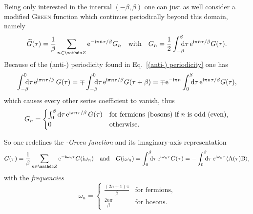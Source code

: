 Being only interested in the interval $(-\beta, \beta)$ one can just as well
consider a modified \textsc{Green} function which continues periodically beyond
this domain, namely
%
\begin{equation*}
    \widetilde G(\tau) = \frac 1 \beta \sum_{n \in \mathds Z}
        \E^{-\I \pi n \tau / \beta} G_n
    \quad \text{with} \quad
    G_n = \frac 1 2 \int \from{-\beta} \till \beta \D \tau \,
        \E^{\I \pi n \tau / \beta} G(\tau).
\end{equation*}
%
Because of the (anti-) periodicity found in Eq.~\ref{(anti-) periodicity} one
has
%
\begin{equation*}
    \int \from{-\beta} \till 0 \D \tau \, \E^{\I \pi n \tau / \beta} \, G(\tau)
    = \mp \int \from{-\beta} \till 0 \D \tau \,
        \E^{\I \pi n \tau / \beta} G(\tau + \beta)
    = \mp \E^{-\I \pi n} \int \from 0 \till \beta \D \tau \,
        \E^{\I \pi n \tau / \beta} G(\tau),
\end{equation*}
%
which causes every other series coefficient to vanish, thus
%
\begin{equation*}
    G_n =
    \begin{cases}
        \int_0^\beta \mathrm d \tau \, \mathrm e^{\mathrm i \pi n \tau / \beta} \, G(\tau)
        & \text{for fermions (bosons) if $n$ is odd (even),} \\ 0
        & \text{otherwise.}
    \end{cases}
\end{equation*}

So one redefines the \emph{-Green function} and its
imaginary-axis representation
%
\begin{equation} \label{Matsubara-Green function}
    G(\tau) = \frac 1 \beta \sum_{n \in \mathds Z}
        \E^{-\I \omega_n \tau} G(\I \omega_n)
    \quad \text{and} \quad
    G(\I \omega_n) = \int \from 0 \till \beta \D \tau \,
        \E^{\I \omega_n \tau} G(\tau)
    = -\int \from 0 \till \beta \D \tau \,
        \E^{\I \omega_n \tau} \av{\op A(\tau) \op B},
\end{equation}
%
with the \emph{ frequencies}
%
\begin{equation*}
    \omega_n =
    \begin{cases}
        \frac{(2 n + 1) \pi} \beta & \text{for fermions}, \\
        \frac{2 n \pi} \beta & \text{for bosons.}
    \end{cases}
\end{equation*}

